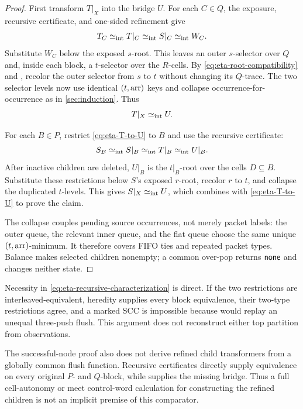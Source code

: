 \begin{proof}
First transform \(T|_X\) into the bridge \(U\).  For each \(C\in Q\), the
exposure, recursive certificate, and one-sided refinement give
\begin{equation}
 T_C\mathrel{\simeq_{\mathrm{int}}} T|_C\mathrel{\simeq_{\mathrm{int}}} S|_C\mathrel{\simeq_{\mathrm{int}}} W_C.
 \label{eq:eta-T-child-chain}
\end{equation}
Substitute \(W_C\) below the exposed \(s\)-root.  This leaves an outer
\(s\)-selector over \(Q\) and, inside each block, a \(t\)-selector over the
\(R\)-cells.  By \autoref{eq:eta-root-compatibility} and
, recolor the outer selector from \(s\) to \(t\) without
changing its \(Q\)-trace.  The two selector levels now use identical
\((t,\operatorname{arr})\) keys and collapse occurrence-for-occurrence as in
\autoref{sec:induction}.  Thus
\begin{equation}
  T|_X\mathrel{\simeq_{\mathrm{int}}} U.
 \label{eq:eta-T-to-U}
\end{equation}

For each \(B\in P\), restrict \autoref{eq:eta-T-to-U} to \(B\) and use the
recursive certificate:
\begin{equation}
 S_B\mathrel{\simeq_{\mathrm{int}}} S|_B\mathrel{\simeq_{\mathrm{int}}} T|_B\mathrel{\simeq_{\mathrm{int}}} U|_B.
 \label{eq:eta-S-child-chain}
\end{equation}
After inactive children are deleted, \(U|_B\) is the \(t|_B\)-root over the
cells \(D\subseteq B\).  Substitute these restrictions below \(S\)'s exposed
\(r\)-root, recolor \(r\) to \(t\), and collapse the duplicated \(t\)-levels.
This gives \(S|_X\mathrel{\simeq_{\mathrm{int}}} U\), which combines with
\autoref{eq:eta-T-to-U} to prove the claim.

The collapse couples pending source occurrences, not merely packet labels:
the outer queue, the relevant inner queue, and the flat queue choose the same
unique \((t,\operatorname{arr})\)-minimum.  It therefore covers FIFO ties and repeated
packet types.  Balance makes selected children nonempty; a common over-pop
returns \(\mathsf{none}\) and changes neither state.
\end{proof}

Necessity in \autoref{eq:eta-recursive-characterization} is direct.  If the two
restrictions are interleaved-equivalent, heredity supplies every block
equivalence, their two-type restrictions agree, and a marked SCC is
impossible because  would replay an unequal
three-push flush.  This argument does not reconstruct either top partition
from observations.

The successful-node proof also does not derive refined child transformers from
a globally common flush function.  Recursive certificates directly supply
equivalence on every original \(P\)- and \(Q\)-block, while
 supplies the missing bridge.  Thus a full
cell-autonomy or meet control-word calculation for constructing the refined
children is not an implicit premise of this comparator.

